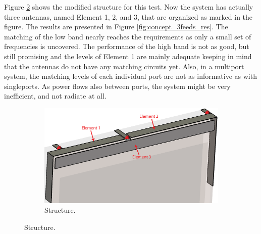 Figure \ref{fig:concept_3feeds_struct} shows the modified structure for this test. Now the system has actually three antennas, named Element 1, 2, and 3, that are organized as marked in the figure. The results are presented in Figure \ref{fig:concept_3feeds_res}. The matching of the low band nearly reaches the requirements as only a small set of frequencies is uncovered. The performance of the high band is not as good, but still promising and the levels of Element 1 are mainly adequate keeping in mind that the antennas do not have any matching circuits yet. Also, in a multiport system, the matching levels of each individual port are not as informative as with singleports. As power flows also between ports, the system might be very inefficient, and not radiate at all.
\begin{figure}[H]
    \centering
    \vspace{-10pt}
    \begin{subfigure}[b]{0.49\textwidth}
        \includegraphics[width=\textwidth]{img/concept_3feed_struct.eps}
        \caption{Structure.}
        \label{fig:concept_3feeds_struct}
    \end{subfigure}
\end{figure}
